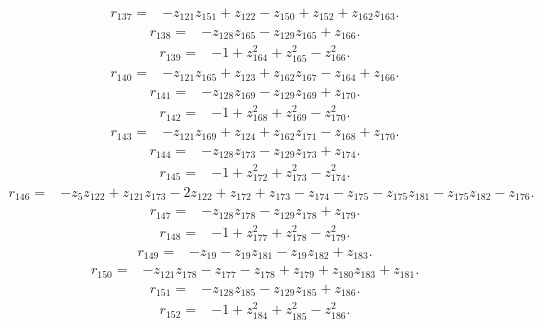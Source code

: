 \begin{align*}
 r_{137}={}&-z_{121}z_{151}+z_{122}-z_{150}+z_{152}+z_{162}z_{163} .
\end{align*}
\begin{align*}
 r_{138}={}&-z_{128}z_{165}-z_{129}z_{165}+z_{166} .
\end{align*}
\begin{align*}
 r_{139}={}&-1+z_{164}^{2}+z_{165}^{2}-z_{166}^{2} .
\end{align*}
\begin{align*}
 r_{140}={}&-z_{121}z_{165}+z_{123}+z_{162}z_{167}-z_{164}+z_{166} .
\end{align*}
\begin{align*}
 r_{141}={}&-z_{128}z_{169}-z_{129}z_{169}+z_{170} .
\end{align*}
\begin{align*}
 r_{142}={}&-1+z_{168}^{2}+z_{169}^{2}-z_{170}^{2} .
\end{align*}
\begin{align*}
 r_{143}={}&-z_{121}z_{169}+z_{124}+z_{162}z_{171}-z_{168}+z_{170} .
\end{align*}
\begin{align*}
 r_{144}={}&-z_{128}z_{173}-z_{129}z_{173}+z_{174} .
\end{align*}
\begin{align*}
 r_{145}={}&-1+z_{172}^{2}+z_{173}^{2}-z_{174}^{2} .
\end{align*}
\begin{align*}
 r_{146}={}&-z_{5}z_{122}+z_{121}z_{173}-2z_{122}+z_{172}+z_{173}-z_{174}-z_{175}-z_{175}z_{181}-z_{175}z_{182}-z_{176} .
\end{align*}
\begin{align*}
 r_{147}={}&-z_{128}z_{178}-z_{129}z_{178}+z_{179} .
\end{align*}
\begin{align*}
 r_{148}={}&-1+z_{177}^{2}+z_{178}^{2}-z_{179}^{2} .
\end{align*}
\begin{align*}
 r_{149}={}&-z_{19}-z_{19}z_{181}-z_{19}z_{182}+z_{183} .
\end{align*}
\begin{align*}
 r_{150}={}&-z_{121}z_{178}-z_{177}-z_{178}+z_{179}+z_{180}z_{183}+z_{181} .
\end{align*}
\begin{align*}
 r_{151}={}&-z_{128}z_{185}-z_{129}z_{185}+z_{186} .
\end{align*}
\begin{align*}
 r_{152}={}&-1+z_{184}^{2}+z_{185}^{2}-z_{186}^{2} .
\end{align*}
